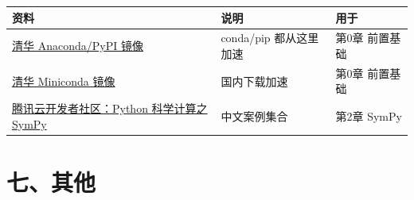 {\def\LTcaptype{none} %
\begin{longtable}[]{@{}
  >{\raggedright\arraybackslash}p{}
  >{\raggedright\arraybackslash}p{}
  >{\raggedright\arraybackslash}p{}@{}}
\toprule\noalign{}
\begin{minipage}[b]{\linewidth}\raggedright
资料
\end{minipage} & \begin{minipage}[b]{\linewidth}\raggedright
说明
\end{minipage} & \begin{minipage}[b]{\linewidth}\raggedright
用于
\end{minipage} \\
\midrule\noalign{}
\endhead
\bottomrule\noalign{}
\endlastfoot
\href{https://mirrors.tuna.tsinghua.edu.cn/}{清华 Anaconda/PyPI 镜像} &
conda/pip 都从这里加速 & 第0章 前置基础 \\
\href{https://mirrors.tuna.tsinghua.edu.cn/anaconda/miniconda/}{清华
Miniconda 镜像} & 国内下载加速 & 第0章 前置基础 \\
\href{https://cloud.tencent.cn/developer/article/2510103}{腾讯云开发者社区：Python
科学计算之 SymPy} & 中文案例集合 & 第2章 SymPy \\
\end{longtable}
}

\section{七、其他}\label{ux4e03ux5176ux4ed6}

